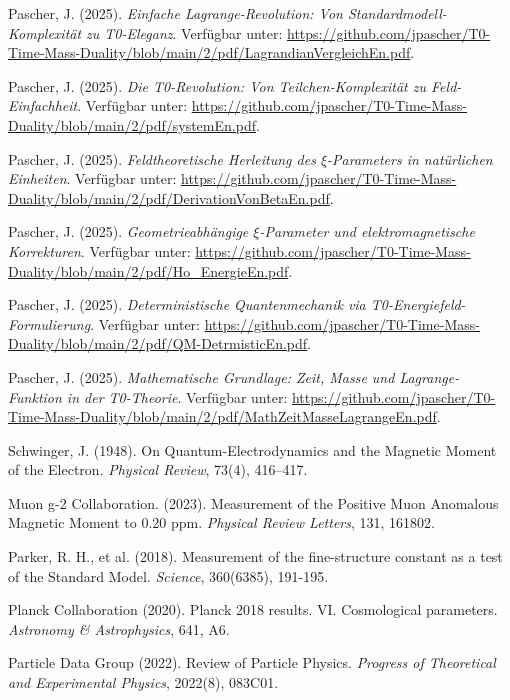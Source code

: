 \documentclass[12pt,a4paper]{article}
\numberwithin{equation}{section}
\begin{document}
\begin{thebibliography}{99}
		Pascher, J. (2025). \emph{Einfache Lagrange-Revolution: Von Standardmodell-Komplexität zu T0-Eleganz}. Verfügbar unter: \url{https://github.com/jpascher/T0-Time-Mass-Duality/blob/main/2/pdf/LagrandianVergleichEn.pdf}.
		
		Pascher, J. (2025). \emph{Die T0-Revolution: Von Teilchen-Komplexität zu Feld-Einfachheit}. Verfügbar unter: \url{https://github.com/jpascher/T0-Time-Mass-Duality/blob/main/2/pdf/systemEn.pdf}.
		
		Pascher, J. (2025). \emph{Feldtheoretische Herleitung des $\xi$-Parameters in natürlichen Einheiten}. Verfügbar unter: \url{https://github.com/jpascher/T0-Time-Mass-Duality/blob/main/2/pdf/DerivationVonBetaEn.pdf}.
		
		Pascher, J. (2025). \emph{Geometrieabhängige $\xi$-Parameter und elektromagnetische Korrekturen}. Verfügbar unter: \url{https://github.com/jpascher/T0-Time-Mass-Duality/blob/main/2/pdf/Ho_EnergieEn.pdf}.
		
		Pascher, J. (2025). \emph{Deterministische Quantenmechanik via T0-Energiefeld-Formulierung}. Verfügbar unter: \url{https://github.com/jpascher/T0-Time-Mass-Duality/blob/main/2/pdf/QM-DetrmisticEn.pdf}.
		
		Pascher, J. (2025). \emph{Mathematische Grundlage: Zeit, Masse und Lagrange-Funktion in der T0-Theorie}. Verfügbar unter: \url{https://github.com/jpascher/T0-Time-Mass-Duality/blob/main/2/pdf/MathZeitMasseLagrangeEn.pdf}.
		
		Schwinger, J. (1948). On Quantum-Electrodynamics and the Magnetic Moment of the Electron. \emph{Physical Review}, 73(4), 416–417.
		
		Muon g-2 Collaboration. (2023). Measurement of the Positive Muon Anomalous Magnetic Moment to 0.20 ppm. \emph{Physical Review Letters}, 131, 161802.
		
		Parker, R. H., et al. (2018). Measurement of the fine-structure constant as a test of the Standard Model. \emph{Science}, 360(6385), 191-195.
		
		Planck Collaboration (2020). Planck 2018 results. VI. Cosmological parameters. \emph{Astronomy \& Astrophysics}, 641, A6.
		
		Particle Data Group (2022). Review of Particle Physics. \emph{Progress of Theoretical and Experimental Physics}, 2022(8), 083C01.
		

\end{thebibliography}
\end{document}
